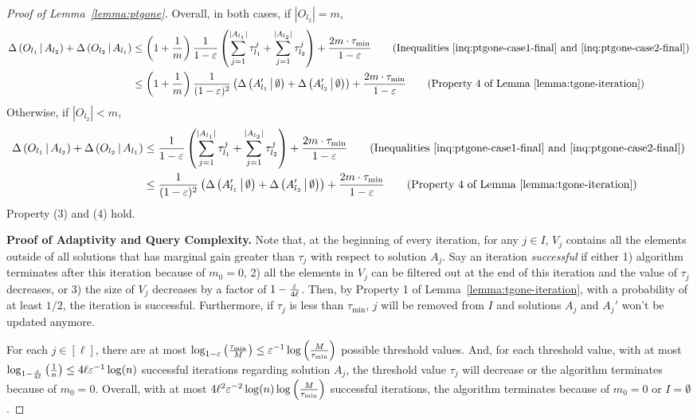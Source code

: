 \begin{proof}[Proof of Lemma~\ref{lemma:ptgone}]
Overall, in both cases, if $|O_{l_2}| = m$,
\begin{align*}
\marge{O_{l_1}}{A_{l_2}}+\marge{O_{l_2}}{A_{l_1}}
&\le \left(1+\frac{1}{m}\right) \frac{1}{1-\epsi}\left(\sum_{j=1}^{|A_{l_1}|} \tau_{l_1}^{j} + \sum_{j=1}^{|A_{l_2}|} \tau_{l_2}^{j}\right) + \frac{2m\cdot \tau_{\min}}{1-\epsi} \tag{Inequalities~\eqref{inq:ptgone-case1-final} and~\eqref{inq:ptgone-case2-final}}\\
&\le \left(1+\frac{1}{m}\right)\frac{1}{(1-\epsi)^2}\left(\marge{A_{l_1}'}{\emptyset}+\marge{A_{l_2}'}{\emptyset}\right) + \frac{2m\cdot \tau_{\min}}{1-\epsi} \tag{Property 4 of Lemma~\ref{lemma:tgone-iteration}}
\end{align*}
Otherwise, if $|O_{l_2}| < m$,
\begin{align*}
\marge{O_{l_1}}{A_{l_2}}+\marge{O_{l_2}}{A_{l_1}}
&\le \frac{1}{1-\epsi}\left(\sum_{j=1}^{|A_{l_1}|} \tau_{l_1}^{j} + \sum_{j=1}^{|A_{l_2}|} \tau_{l_2}^{j}\right) + \frac{2m\cdot \tau_{\min}}{1-\epsi} \tag{Inequalities~\eqref{inq:ptgone-case1-final} and~\eqref{inq:ptgone-case2-final}}\\
&\le \frac{1}{(1-\epsi)^2}\left(\marge{A_{l_1}'}{\emptyset}+\marge{A_{l_2}'}{\emptyset}\right) + \frac{2m\cdot \tau_{\min}}{1-\epsi} \tag{Property 4 of Lemma~\ref{lemma:tgone-iteration}}
\end{align*}
Property (3) and (4) hold.

\textbf{Proof of Adaptivity and Query Complexity.}
Note that, at the beginning of every iteration,
for any $j\in I$, $V_j$ contains all the elements outside of all solutions that has marginal gain greater than $\tau_j$ with respect to solution $A_j$.
Say an iteration \textit{successful} if either
1) algorithm terminates after this iteration because of $m_0=0$,
2) all the elements in $V_j$ can be filtered out at the end of this iteration
and the value of $\tau_j$ decreases,
or 3) the size of $V_j$ decreases by a factor of $1-\frac{\varepsilon}{4\ell}$.
Then, by Property 1 of Lemma~\ref{lemma:tgone-iteration},
with a probability of at least $1/2$,
the iteration is successful.
Furthermore, if $\tau_j$ is less than $\tau_{\min}$,
$j$ will be removed from $I$ and 
solutions $A_j$ and $A_j'$ won't be updated anymore.

For each $j \in [\ell]$,
there are at most $\log_{1-\varepsilon}\left(\frac{\tau_{\min}}{M}\right) \le \varepsilon^{-1}\log\left(\frac{M}{\tau_{\min}}\right)$ possible threshold values.
And, for each threshold value, with at most 
$\log_{1-\frac{\varepsilon}{4\ell}}\left(\frac{1}{n}\right) \le 4\ell\varepsilon^{-1}\log(n)$
successful iterations regarding solution $A_j$,
the threshold value $\tau_j$ will decrease
or the algorithm terminates because of $m_0=0$.
Overall, with at most $4\ell^2\varepsilon^{-2}\log(n)\log\left(\frac{M}{\tau_{\min}}\right)$
successful iterations,
the algorithm terminates because of $m_0=0$ or $I=\emptyset$.


\end{proof}
